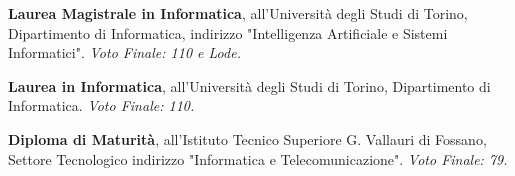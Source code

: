 
\begin{scholarship}
	{\textbf{Laurea Magistrale in Informatica},  all'Università degli Studi di Torino, Dipartimento di Informatica, indirizzo "Intelligenza Artificiale e Sistemi Informatici". \textit{Voto Finale: 110 e Lode.}}
					
	{\textbf{Laurea in Informatica}, all'Università degli Studi di Torino, Dipartimento di Informatica. \textit{Voto Finale: 110.}}
						
	{\textbf{Diploma di Maturità}, all'Istituto Tecnico Superiore G. Vallauri di Fossano, Settore Tecnologico indirizzo "Informatica e Telecomunicazione". \textit{Voto Finale: 79.}}
		
\end{scholarship}
